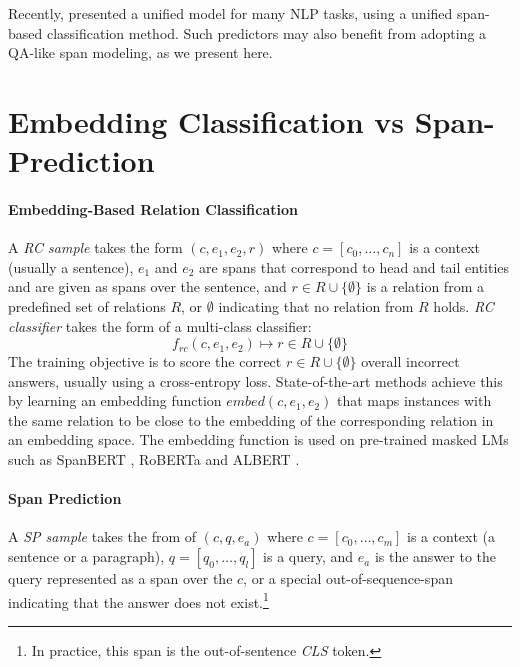\documentclass[11pt]{article}
\begin{document}
Recently, \citet{Jiang2019} presented a unified model for many NLP tasks, using a unified span-based classification method. Such predictors may also benefit from adopting a QA-like span modeling, as we present here.













\section{Embedding Classification vs Span-Prediction}
\paragraph{Embedding-Based Relation Classification} \label{ssec:rc}
A \emph{RC sample} takes the form $(c, e_1, e_2, r)$ where $c = [c_0, \ldots, c_n]$ is a context (usually a sentence), $e_1$ and $e_2$ are spans that correspond to head and tail entities and are given as spans over the sentence, and $r \in R\cup\{\emptyset\}$ is a relation from a predefined set of relations $R$, or $\emptyset$ indicating that no relation from $R$ holds.
\emph{RC classifier} takes the form of a multi-class classifier:
\[f_{rc}(c, e_1, e_2) \mapsto r \in R\cup\{\emptyset\}\]
\noindent The training objective is to score the correct $r \in R\cup\{\emptyset\}$ overall incorrect answers, usually using a cross-entropy loss. State-of-the-art methods \cite{Soares2019} achieve this by learning an embedding function $embed(c, e_1, e_2)$ that maps instances with the same relation to be close to the embedding of the corresponding relation in an embedding space. The embedding function is used on pre-trained masked LMs such as SpanBERT \cite{Joshi2019}, RoBERTa \cite{Liu2019} and ALBERT \cite{Lan2019}.

\paragraph{Span Prediction}
A \emph{SP sample} takes the from of $(c, q, e_a)$ where $c = [c_0, \ldots, c_m]$ is a context (a sentence or a paragraph), $q = [q_0, \ldots, q_l]$ is a query, and $e_a$ is the answer to the query represented as a span over the $c$, or a special out-of-sequence-span indicating that the answer does not exist.\footnote{In practice, this span is the out-of-sentence \emph{CLS} token.} 
\end{document}
